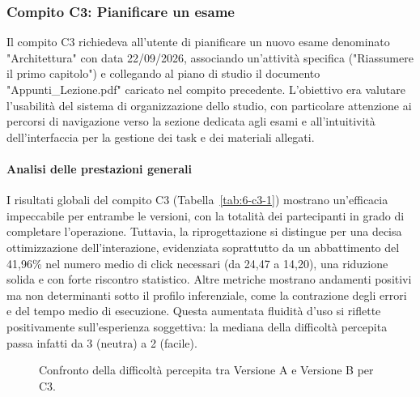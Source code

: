 \subsubsection{Compito C3: Pianificare un esame}

Il compito C3 richiedeva all'utente di pianificare un nuovo esame denominato "Architettura" con data 22/09/2026, associando un'attività specifica ("Riassumere il primo capitolo") e collegando al piano di studio il documento "Appunti\_Lezione.pdf" caricato nel compito precedente. L'obiettivo era valutare l'usabilità del sistema di organizzazione dello studio, con particolare attenzione ai percorsi di navigazione verso la sezione dedicata agli esami e all'intuitività dell'interfaccia per la gestione dei task e dei materiali allegati.

\paragraph{Analisi delle prestazioni generali}

I risultati globali del compito C3 (Tabella~\ref{tab:6-c3-1}) mostrano un'efficacia impeccabile per entrambe le versioni, con la totalità dei partecipanti in grado di completare l'operazione. Tuttavia, la riprogettazione si distingue per una decisa ottimizzazione dell'interazione, evidenziata soprattutto da un abbattimento del 41,96\% nel numero medio di click necessari (da 24,47 a 14,20), una riduzione solida e con forte riscontro statistico. Altre metriche mostrano andamenti positivi ma non determinanti sotto il profilo inferenziale, come la contrazione degli errori e del tempo medio di esecuzione. Questa aumentata fluidità d'uso si riflette positivamente sull'esperienza soggettiva: la mediana della difficoltà percepita passa infatti da 3 (neutra) a 2 (facile).

\begin{figure}[H]
	\centering
	\caption{Confronto della difficoltà percepita tra Versione A e Versione B per C3.}
	\label{fig:6-c3-1}
\end{figure}

